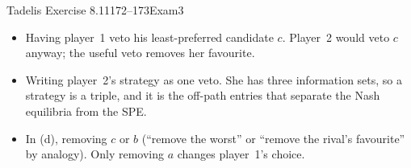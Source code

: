 \begin{exsol}{Tadelis Exercise 8.11}{172--173}{Exam}{3}
\mistakes
\begin{itemize}
  \item Having player~1 veto his least-preferred candidate $c$. Player~2 would veto $c$ anyway; the
  useful veto removes her favourite.
  \item Writing player~2's strategy as one veto. She has three information sets, so a strategy is
  a triple, and it is the off-path entries that separate the Nash equilibria from the SPE.
  \item In (d), removing $c$ or $b$ (``remove the worst'' or ``remove the rival's favourite'' by
  analogy). Only removing $a$ changes player~1's choice.
\end{itemize}

\end{exsol}
